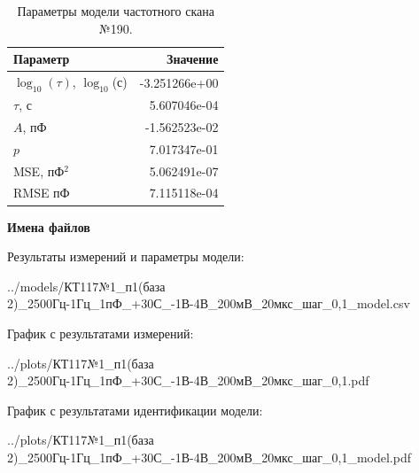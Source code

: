\begin{table}[!ht]
    \centering
    \caption{Параметры модели частотного скана №190.}
    \begin{tabular}{|l|r|}
        \hline
        Параметр                                       & Значение                  \\ \hline
        $\log_{10}(\tau)$, $\log_{10}$(с)              & -3.251266e+00             \\ \hline
        $\tau$, с                                      & 5.607046e-04              \\ \hline
        $A$, пФ                                        & -1.562523e-02             \\ \hline
        $p$                                            & 7.017347e-01              \\ \hline
        MSE, пФ$^2$                                    & 5.062491e-07              \\ \hline
        RMSE пФ                                        & 7.115118e-04              \\ \hline
    \end{tabular}
    \label{table:frequency_scan_model_190}
\end{table}

\textbf{Имена файлов}

Результаты измерений и параметры модели:

\scriptsize../models/КТ117№1\_п1(база 2)\_2500Гц-1Гц\_1пФ\_+30С\_-1В-4В\_200мВ\_20мкс\_шаг\_0,1\_model.csv
\normalsize

График с результатами измерений:

\scriptsize../plots/КТ117№1\_п1(база 2)\_2500Гц-1Гц\_1пФ\_+30С\_-1В-4В\_200мВ\_20мкс\_шаг\_0,1.pdf
\normalsize

График с результатами идентификации модели:

\scriptsize../plots/КТ117№1\_п1(база 2)\_2500Гц-1Гц\_1пФ\_+30С\_-1В-4В\_200мВ\_20мкс\_шаг\_0,1\_model.pdf
\normalsize

